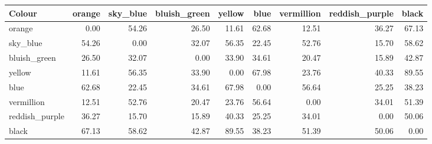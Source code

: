 \begin{tabular}{lrrrrrrrr}
\toprule
Colour & orange & sky\_blue & bluish\_green & yellow & blue & vermillion & reddish\_purple & black \\
\midrule
orange & 0.00 & 54.26 & 26.50 & 11.61 & 62.68 & 12.51 & 36.27 & 67.13 \\
sky\_blue & 54.26 & 0.00 & 32.07 & 56.35 & 22.45 & 52.76 & 15.70 & 58.62 \\
bluish\_green & 26.50 & 32.07 & 0.00 & 33.90 & 34.61 & 20.47 & 15.89 & 42.87 \\
yellow & 11.61 & 56.35 & 33.90 & 0.00 & 67.98 & 23.76 & 40.33 & 89.55 \\
blue & 62.68 & 22.45 & 34.61 & 67.98 & 0.00 & 56.64 & 25.25 & 38.23 \\
vermillion & 12.51 & 52.76 & 20.47 & 23.76 & 56.64 & 0.00 & 34.01 & 51.39 \\
reddish\_purple & 36.27 & 15.70 & 15.89 & 40.33 & 25.25 & 34.01 & 0.00 & 50.06 \\
black & 67.13 & 58.62 & 42.87 & 89.55 & 38.23 & 51.39 & 50.06 & 0.00 \\
\bottomrule
\end{tabular}
